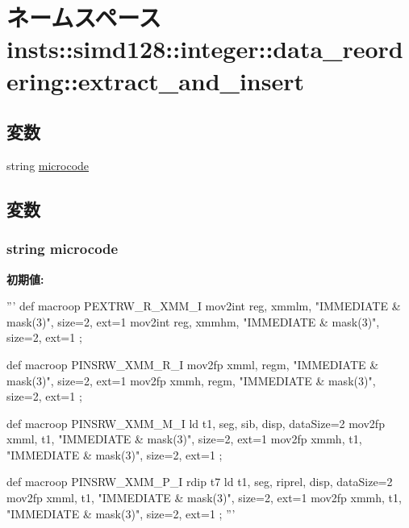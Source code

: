 \hypertarget{namespaceinsts_1_1simd128_1_1integer_1_1data__reordering_1_1extract__and__insert}{
\section{ネームスペース insts::simd128::integer::data\_\-reordering::extract\_\-and\_\-insert}
\label{namespaceinsts_1_1simd128_1_1integer_1_1data__reordering_1_1extract__and__insert}
}
\subsection*{変数}
\begin{DoxyCompactItemize}
\item 
string \hyperlink{namespaceinsts_1_1simd128_1_1integer_1_1data__reordering_1_1extract__and__insert_a770f11a173e99389a8802f0107ed8f52}{microcode}
\end{DoxyCompactItemize}


\subsection{変数}
\hypertarget{namespaceinsts_1_1simd128_1_1integer_1_1data__reordering_1_1extract__and__insert_a770f11a173e99389a8802f0107ed8f52}{
\subsubsection[{microcode}]{\setlength{\rightskip}{0pt plus 5cm}string {\bf microcode}}}
\label{namespaceinsts_1_1simd128_1_1integer_1_1data__reordering_1_1extract__and__insert_a770f11a173e99389a8802f0107ed8f52}
{\bfseries 初期値:}
\begin{DoxyCode}
'''
def macroop PEXTRW_R_XMM_I {
    mov2int reg, xmmlm, "IMMEDIATE & mask(3)", size=2, ext=1
    mov2int reg, xmmhm, "IMMEDIATE & mask(3)", size=2, ext=1
};

def macroop PINSRW_XMM_R_I {
    mov2fp xmml, regm, "IMMEDIATE & mask(3)", size=2, ext=1
    mov2fp xmmh, regm, "IMMEDIATE & mask(3)", size=2, ext=1
};

def macroop PINSRW_XMM_M_I {
    ld t1, seg, sib, disp, dataSize=2
    mov2fp xmml, t1, "IMMEDIATE & mask(3)", size=2, ext=1
    mov2fp xmmh, t1, "IMMEDIATE & mask(3)", size=2, ext=1
};

def macroop PINSRW_XMM_P_I {
    rdip t7
    ld t1, seg, riprel, disp, dataSize=2
    mov2fp xmml, t1, "IMMEDIATE & mask(3)", size=2, ext=1
    mov2fp xmmh, t1, "IMMEDIATE & mask(3)", size=2, ext=1
};
'''
\end{DoxyCode}
